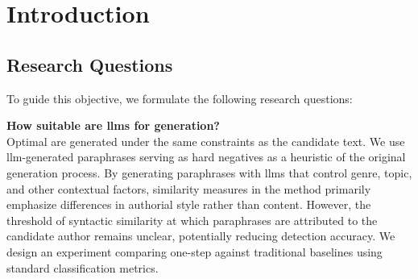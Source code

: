 \chapter{Introduction}
\label{chap:introduction}





\section{Research Questions}
\label{sec:research_questions}
To guide this objective, we formulate the following research questions:
\begin{questions}
    \item \textbf{How suitable are \acp{llm} for \imp{} generation?} \label{enum:rq1} \hfill \\
    Optimal \imps{} are generated under the same constraints as the candidate text.
    We use \ac{llm}-generated paraphrases serving as hard negatives as a heuristic of the original generation process.
    By generating paraphrases with \acp{llm} that control genre, topic, and other contextual factors, similarity measures in the \imp{} method primarily emphasize differences in authorial style rather than content.
    However, the threshold of syntactic similarity at which paraphrases are attributed to the candidate author remains unclear, potentially reducing detection accuracy.
    We design an experiment comparing one-step %
    against traditional baselines using standard classification metrics.


\end{questions}
